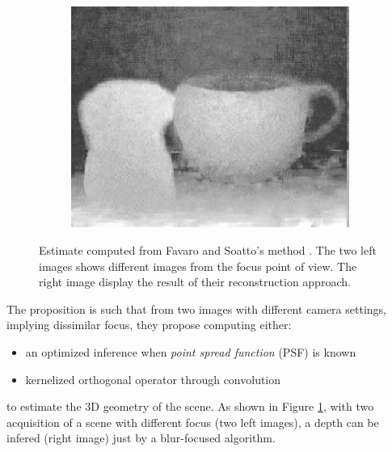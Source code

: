 \begin{figure}[h]
\begin{subfigure}{.3\textwidth}
		\centering
		\includegraphics[width=\linewidth]{Figures/SOA/fav-r.png}
	\end{subfigure}
	\caption[Estimate computed from Favaro and Soatto's method.]{Estimate computed from Favaro and Soatto's method \cite{favaro2005geometric}. The two left images shows different images from the focus point of view. The right image display the result of their reconstruction approach.}
	\label{illufavaro}
\end{figure}

The proposition is such that from two images with different camera settings, implying dissimilar focus, they propose computing either:

\begin{itemize}
\item an optimized inference when \emph{point spread function} (PSF) \cite{rossmann1969point} is known
\item kernelized orthogonal operator through convolution
\end{itemize}

to estimate the 3D geometry of the scene. As shown in Figure \ref{illufavaro}, with two acquisition of a scene with different focus (two left images), a depth can be infered (right image) just by a blur-focused algorithm.



